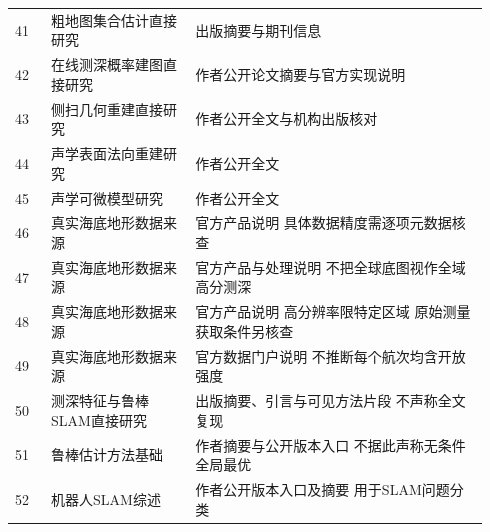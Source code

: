\begin{longtable}[]{@{}p{0.07\linewidth}p{0.29\linewidth}p{0.58\linewidth}@{}}
41 & 粗地图集合估计直接研究 & 出版摘要与期刊信息\tabularnewline
42 & 在线测深概率建图直接研究 & 作者公开论文摘要与官方实现说明\tabularnewline
43 & 侧扫几何重建直接研究 & 作者公开全文与机构出版核对\tabularnewline
44 & 声学表面法向重建研究 & 作者公开全文\tabularnewline
45 & 声学可微模型研究 & 作者公开全文\tabularnewline
46 & 真实海底地形数据来源 & 官方产品说明 具体数据精度需逐项元数据核查\tabularnewline
47 & 真实海底地形数据来源 & 官方产品与处理说明 不把全球底图视作全域高分测深\tabularnewline
48 & 真实海底地形数据来源 & 官方产品说明 高分辨率限特定区域 原始测量获取条件另核查\tabularnewline
49 & 真实海底地形数据来源 & 官方数据门户说明 不推断每个航次均含开放强度\tabularnewline
50 & 测深特征与鲁棒SLAM直接研究 & 出版摘要、引言与可见方法片段 不声称全文复现\tabularnewline
51 & 鲁棒估计方法基础 & 作者摘要与公开版本入口 不据此声称无条件全局最优\tabularnewline
52 & 机器人SLAM综述 & 作者公开版本入口及摘要 用于SLAM问题分类\tabularnewline
\bottomrule
\end{longtable}
